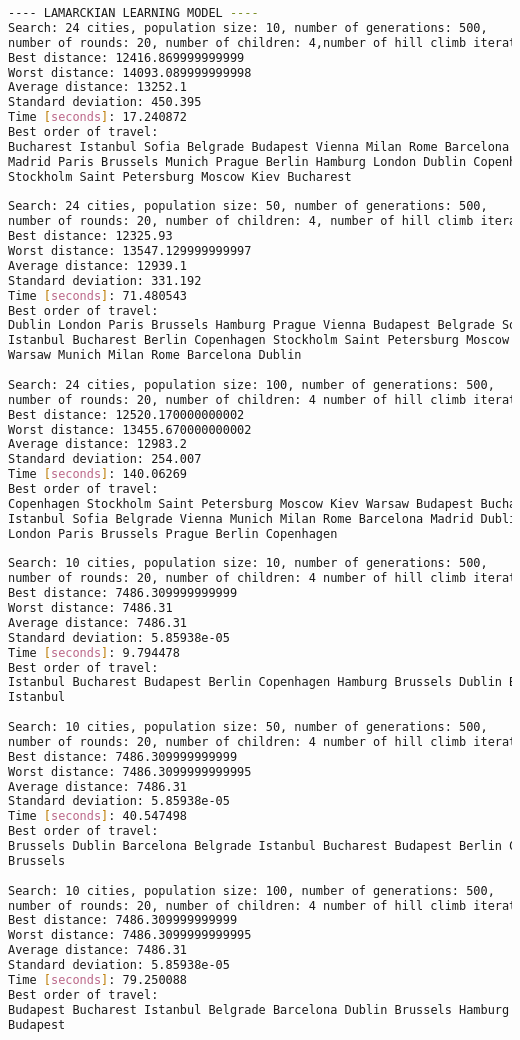 \documentclass{article}
\begin{document}
\begin{lstlisting}[language=bash]
---- LAMARCKIAN LEARNING MODEL ----
Search: 24 cities, population size: 10, number of generations: 500, 
number of rounds: 20, number of children: 4,number of hill climb iterations: 3: 
Best distance: 12416.869999999999
Worst distance: 14093.089999999998
Average distance: 13252.1
Standard deviation: 450.395
Time [seconds]: 17.240872
Best order of travel: 
Bucharest Istanbul Sofia Belgrade Budapest Vienna Milan Rome Barcelona 
Madrid Paris Brussels Munich Prague Berlin Hamburg London Dublin Copenhagen 
Stockholm Saint Petersburg Moscow Kiev Bucharest
 
Search: 24 cities, population size: 50, number of generations: 500, 
number of rounds: 20, number of children: 4, number of hill climb iterations: 3: 
Best distance: 12325.93
Worst distance: 13547.129999999997
Average distance: 12939.1
Standard deviation: 331.192
Time [seconds]: 71.480543
Best order of travel: 
Dublin London Paris Brussels Hamburg Prague Vienna Budapest Belgrade Sofia 
Istanbul Bucharest Berlin Copenhagen Stockholm Saint Petersburg Moscow Kiev 
Warsaw Munich Milan Rome Barcelona Dublin
 
Search: 24 cities, population size: 100, number of generations: 500, 
number of rounds: 20, number of children: 4 number of hill climb iterations: 3: 
Best distance: 12520.170000000002
Worst distance: 13455.670000000002
Average distance: 12983.2
Standard deviation: 254.007
Time [seconds]: 140.06269
Best order of travel: 
Copenhagen Stockholm Saint Petersburg Moscow Kiev Warsaw Budapest Bucharest 
Istanbul Sofia Belgrade Vienna Munich Milan Rome Barcelona Madrid Dublin 
London Paris Brussels Prague Berlin Copenhagen
 
Search: 10 cities, population size: 10, number of generations: 500, 
number of rounds: 20, number of children: 4 number of hill climb iterations: 3: 
Best distance: 7486.309999999999
Worst distance: 7486.31
Average distance: 7486.31
Standard deviation: 5.85938e-05
Time [seconds]: 9.794478
Best order of travel: 
Istanbul Bucharest Budapest Berlin Copenhagen Hamburg Brussels Dublin Barcelona 
Istanbul
 
Search: 10 cities, population size: 50, number of generations: 500, 
number of rounds: 20, number of children: 4 number of hill climb iterations: 3: 
Best distance: 7486.309999999999
Worst distance: 7486.3099999999995
Average distance: 7486.31
Standard deviation: 5.85938e-05
Time [seconds]: 40.547498
Best order of travel: 
Brussels Dublin Barcelona Belgrade Istanbul Bucharest Budapest Berlin Copenhagen 
Brussels
 
Search: 10 cities, population size: 100, number of generations: 500, 
number of rounds: 20, number of children: 4 number of hill climb iterations: 3: 
Best distance: 7486.309999999999
Worst distance: 7486.3099999999995
Average distance: 7486.31
Standard deviation: 5.85938e-05
Time [seconds]: 79.250088
Best order of travel: 
Budapest Bucharest Istanbul Belgrade Barcelona Dublin Brussels Hamburg Copenhagen 
Budapest
\end{lstlisting}
\end{document}

